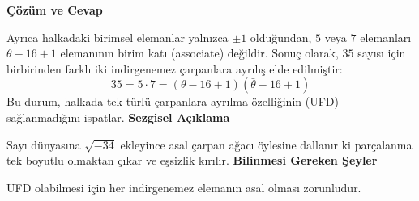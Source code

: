 \documentclass[11pt, a4paper]{article}
\newenvironment{cozum}{
    \vspace{0.5cm}
    \noindent\textcolor{green!60!black}{\faCheckCircle\enspace \textbf{\Large Çözüm ve Cevap}}\par\vspace{0.2cm}
}{}
\newenvironment{sezgisel}{
    \vspace{0.5cm}
    \noindent\textcolor{orange!80!black}{\faLightbulb\enspace \textbf{\Large Sezgisel Açıklama}}\par\vspace{0.2cm}
    \itshape
}{}
\newenvironment{bilgi}{
    \vspace{0.5cm}
    \noindent\textcolor{red!70!black}{\faExclamationTriangle\enspace \textbf{\Large Bilinmesi Gereken Şeyler}}\par\vspace{0.2cm}
}{}
\begin{document}
\begin{cozum}
Ayrıca halkadaki birimsel elemanlar yalnızca $\pm 1$ olduğundan, $5$ veya $7$ elemanları $\theta - 16 + 1$ elemanının birim katı (associate) değildir. Sonuç olarak, $35$ sayısı için birbirinden farklı iki indirgenemez çarpanlara ayrılış elde edilmiştir:
\[ 35 = 5 \cdot 7 = (\theta - 16 + 1)(\bar{\theta} - 16 + 1) \]
Bu durum, halkada tek türlü çarpanlara ayrılma özelliğinin (UFD) sağlanmadığını ispatlar.
\end{cozum}
\begin{sezgisel}
Sayı dünyasına $\sqrt{-34}$ ekleyince asal çarpan ağacı öylesine dallanır ki parçalanma tek boyutlu olmaktan çıkar ve eşsizlik kırılır.
\end{sezgisel}
\begin{bilgi}
UFD olabilmesi için her indirgenemez elemanın asal olması zorunludur.
\end{bilgi}

\newpage
\end{document}
